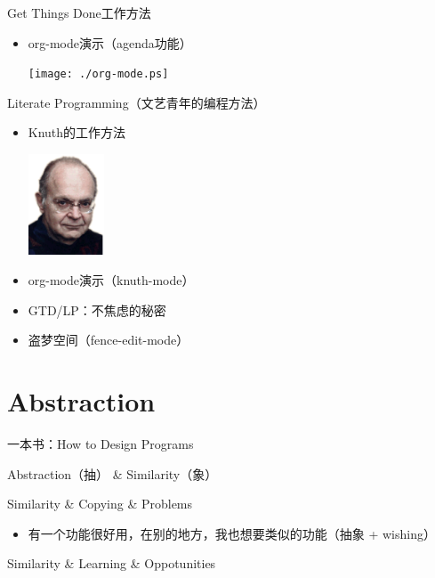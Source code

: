 \documentclass[presentation,dvipdfmx,CJKbookmarks]{beamer}
\begin{document}
\begin{CJK*}{UTF8}{simsun}
\begin{frame}[label={sec:orgc61e60b}]{Get Things Done\thinspace 工作方法}
\begin{itemize}[<+->]
\item org-mode\thinspace 演示（agenda\thinspace 功能）

\begin{center}
\texttt{[image: ./org-mode.ps]}
\end{center}
\end{itemize}
\end{frame}

\begin{frame}[label={sec:orgc153370}]{Literate Programming（文艺青年的编程方法）}
\begin{itemize}[<+->]
\item Knuth\thinspace 的工作方法

\begin{center}
\includegraphics[height=3cm]{./knuth.ps}
\end{center}
\end{itemize}

\pause
\begin{itemize}
\item org-mode\thinspace 演示（knuth-mode）
\end{itemize}
\pause
\begin{itemize}
\item GTD/LP：不焦虑的秘密
\end{itemize}
\pause
\begin{itemize}
\item 盗梦空间（fence-edit-mode）
\end{itemize}
\end{frame}

\section{Abstraction}
\label{sec:orgf29cc07}

\begin{frame}[label={sec:org7a5e043}]{一本书：How to Design Programs}
\pause
\begin{block}{Abstraction（抽） \& Similarity（象）}
\pause
\end{block}
\begin{block}{Similarity \& Copying \& Problems}
\pause
\begin{itemize}
\item 有一个功能很好用，在别的地方，我也想要类似的功能（抽象 + wishing）
\end{itemize}
\pause
\end{block}
\begin{block}{Similarity \& Learning \& Oppotunities}
\end{block}
\end{frame}


\end{CJK*}
\end{document}
